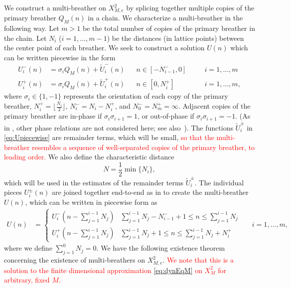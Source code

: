 \documentclass[12pt,reqno]{amsart}
\theoremstyle{definition}
\newcommand{\revised}[1]{ \textcolor{red}{#1} }
\begin{document}
We construct a multi-breather on $X_{M,e}^2$ by splicing together multiple copies of the primary breather $Q_M(n)$ in a chain. We characterize a multi-breather in the following way. Let $m > 1$ be the total number of copies of the primary breather in the chain. Let $N_i$ ($i = 1, \dots, m-1$) be the distances (in lattice points) between the center point of each breather. We seek to construct a solution $U(n)$ which can be written piecewise in the form
\begin{equation}\label{eq:Upiecewise}
\begin{aligned}
U_i^-(n) &= \sigma_i Q_M(n) + \tilde{U}_i^-(n) && n \in [-N_{i-1}^-, 0] && \quad i = 1, \dots, m\\
U_i^+(n) &= \sigma_i Q_M(n) + \tilde{U}_i^+(n) && n \in [0, N_i^+] && \quad i = 1, \dots, m,
\end{aligned}
\end{equation}
where $\sigma_i \in \{1, -1\}$ represents the orientation of each copy of the primary breather, $N_i^+ = \lfloor \frac{N_i}{2} \rfloor$, $N_i^- = N_i - N_i^+$, and $N_0^- = N_m^+ = \infty$. Adjacent copies of the primary breather are in-phase if $\sigma_i \sigma_{i+1} = 1$, or out-of-phase if $\sigma_i \sigma_{i+1} = -1$. (As in \cite{Pelinovsky2012}, other phase relations are not considered here; see also~\cite{KOUKOULOYANNIS20132022}). The functions $\tilde{U}_i^\pm$ in \cref{eq:Upiecewise} are remainder terms, which will be small,
\revised{
so that the multi-breather resembles a sequence of well-separated copies of the primary breather, to leading order.
}
We also define the characteristic distance
\begin{equation}\label{defN}
N = \frac{1}{2} \min\{ N_i \},
\end{equation}
which will be used in the estimates of the remainder terms $\tilde{U}_i^\pm$. The individual pieces $U_i^\pm(n)$ are joined together end-to-end as in \cites{Sandstede1998,Knobloch2000,Parker2020,Parker2021} to create the multi-breather $U(n)$, which can be written in piecewise form as
\begin{equation}
\begin{aligned}
U(n) &= \begin{cases}
U_i^-\left( n - \sum_{j=1}^{i-1}N_j \right) & \sum_{j=1}^{i-1}N_j - N_{i-1}^- + 1 \leq n \leq \sum_{j=1}^{i-1}N_j \\
U_i^+\left( n - \sum_{j=1}^{i-1}N_j \right) & \sum_{j=1}^{i-1}N_j + 1 \leq n \leq \sum_{j=1}^{i-1}N_j + N_i^+
\end{cases}
&& i = 1, \dots, m,
\end{aligned}
\end{equation}
where we define $\sum_{j=1}^0 N_j = 0$. We have the following existence theorem concerning the existence of multi-breathers on $X_{M,e}^2$. 
\revised{
We note that this is a solution to the finite dimensional approximation \cref{eq:dynEqM} on $X_{M}^2$ for arbitrary, fixed $M$.
}
\end{document}

